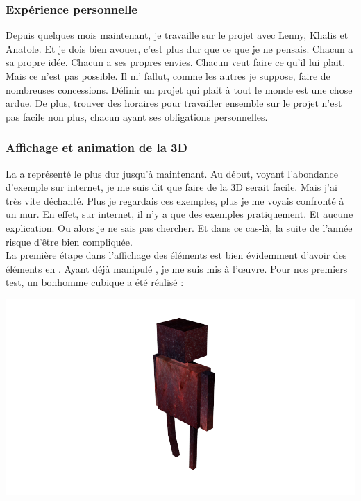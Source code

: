 \documentclass{article}
\begin{document}
\subsubsection{Expérience personnelle}

Depuis quelques mois maintenant, je travaille sur le projet avec Lenny, Khalis et Anatole. Et je dois bien avouer, c'est plus dur que ce que je ne pensais. Chacun a sa propre idée. Chacun a ses propres envies. Chacun veut faire ce qu'il lui plait. Mais ce n'est pas possible. Il m' fallut, comme les autres je suppose, faire de nombreuses concessions. Définir un projet qui plait à tout le monde est une chose ardue. De plus, trouver des horaires pour travailler ensemble sur le projet n'est pas facile non plus, chacun ayant ses obligations personnelles.

\subsubsection{Affichage et animation de la 3D}
La  a représenté le plus dur jusqu'à maintenant. Au début, voyant l'abondance d'exemple sur internet, je me suis dit que faire de la 3D serait facile. Mais j'ai très vite déchanté. Plus je regardais ces exemples, plus je me voyais confronté à un mur. En effet, sur internet, il n'y a que des exemples pratiquement. Et aucune explication. Ou alors je ne sais pas chercher. Et dans ce cas-là, la suite de l'année risque d'être bien compliquée. \\
La première étape dans l'affichage des éléments  est bien évidemment d'avoir des éléments en . Ayant déjà manipulé , je me suis mis à l'œuvre. Pour nos premiers test, un bonhomme cubique a été réalisé : \begin{center}
\includegraphics[scale=0.7]{perso}
\end{center}
\end{document}
